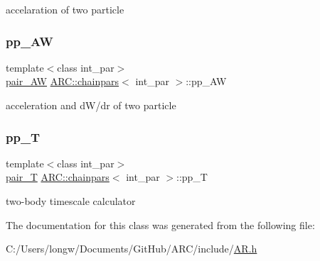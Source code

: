 accelaration of two particle 

\hypertarget{classARC_1_1chainpars_a4be95af92d02bd0600b0983568f6eedb}{}\label{classARC_1_1chainpars_a4be95af92d02bd0600b0983568f6eedb} 
\subsubsection{\texorpdfstring{pp\+\_\+\+AW}{pp\_AW}}
{\footnotesize\ttfamily template$<$class int\+\_\+par$>$ \\
\hyperlink{classARC_1_1chainpars_a9558124278a55c0301642e1df63be063}{pair\+\_\+\+AW} \hyperlink{classARC_1_1chainpars}{A\+R\+C\+::chainpars}$<$ int\+\_\+par $>$\+::pp\+\_\+\+AW}



acceleration and d\+W/dr of two particle 

\hypertarget{classARC_1_1chainpars_a7c32202cef65215a7bdfb71ca4e4acf8}{}\label{classARC_1_1chainpars_a7c32202cef65215a7bdfb71ca4e4acf8} 
\subsubsection{\texorpdfstring{pp\+\_\+T}{pp\_T}}
{\footnotesize\ttfamily template$<$class int\+\_\+par$>$ \\
\hyperlink{classARC_1_1chainpars_a860194e916f3ae900e93beedd277fa3c}{pair\+\_\+T} \hyperlink{classARC_1_1chainpars}{A\+R\+C\+::chainpars}$<$ int\+\_\+par $>$\+::pp\+\_\+T}



two-\/body timescale calculator 



The documentation for this class was generated from the following file\+:\begin{DoxyCompactItemize}
\item 
C\+:/\+Users/longw/\+Documents/\+Git\+Hub/\+A\+R\+C/include/\hyperlink{AR_8h}{A\+R.\+h}\end{DoxyCompactItemize}
